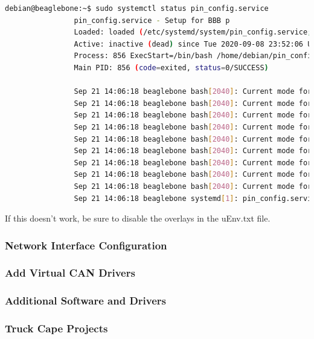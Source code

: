             \begin{lstlisting}[language=bash, autogobble=true]
                debian@beaglebone:~$ sudo systemctl status pin_config.service
                pin_config.service - Setup for BBB p
                Loaded: loaded (/etc/systemd/system/pin_config.service; enabled; vendor preset: enabled)
                Active: inactive (dead) since Tue 2020-09-08 23:52:06 UTC; 2min 18s ago
                Process: 856 ExecStart=/bin/bash /home/debian/pin_config.sh (code=exited, statuSUCCESS)
                Main PID: 856 (code=exited, status=0/SUCCESS)
    
                Sep 21 14:06:18 beaglebone bash[2040]: Current mode for P9_13 is:     uart
                Sep 21 14:06:18 beaglebone bash[2040]: Current mode for P8_37 is:     uart
                Sep 21 14:06:18 beaglebone bash[2040]: Current mode for P8_38 is:     uart
                Sep 21 14:06:18 beaglebone bash[2040]: Current mode for P8_46 is:     pwm
                Sep 21 14:06:18 beaglebone bash[2040]: Current mode for P8_45 is:     pwm
                Sep 21 14:06:18 beaglebone bash[2040]: Current mode for P8_34 is:     pwm
                Sep 21 14:06:18 beaglebone bash[2040]: Current mode for P8_36 is:     pwm
                Sep 21 14:06:18 beaglebone bash[2040]: Current mode for P9_12 is:     gpio
                Sep 21 14:06:18 beaglebone bash[2040]: Current mode for P9_14 is:     gpio
                Sep 21 14:06:18 beaglebone systemd[1]: pin_config.service: Succeeded.
            \end{lstlisting}
            If this doesn't work, be sure to disable the overlays in the uEnv.txt file.
        
        \subsubsection{Network Interface Configuration}   
        \subsubsection{Add Virtual CAN Drivers}
            
        \subsubsection{Additional Software and Drivers}
        \subsubsection{Truck Cape Projects}
            
